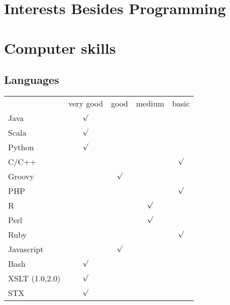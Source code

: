 \documentclass[11pt,a4paper,german]{moderncv}
\begin{document}
\section{Interests Besides Programming}


\newpage
\section{Computer skills}
\subsection{Languages}
\setlength{\tabcolsep}{12pt}
{
\begin{tabular}{l*{4}{c}}
& very good & good & medium & basic \\
Java & $ \surd $ & & & \\
Scala & $ \surd $ & & & \\
Python & $ \surd $ & & & \\
C/C++ & & & & $\surd$ \\
Groovy & & $\surd$ & &  \\
PHP & & & & $\surd$ \\
R & & & $\surd$ &  \\
Perl & & & $\surd$ &  \\
Ruby & & & & $\surd$ \\
Javascript & & $\surd$ & & \\
Bash & $\surd$ & & &  \\
XSLT (1.0,2.0) & $\surd$ & & &  \\
STX & $\surd$ & & &  \\
\end{tabular}
}{}
\end{document}
